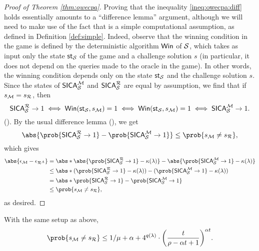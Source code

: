 \begin{proof}[Proof of Theorem \ref{thm:owecpa}]
  Proving that the inequality \eqref{ineq:owecpa:diff} holds
  essentially amounts to a ``difference lemma'' argument,
  although we will need to make use of the fact that \Simple is a simple computational assumption,
  as defined in Definition \ref{def:simple}.
  Indeed, observe that the winning condition in the game \SICA
  is defined by the deterministic algorithm \(\mathsf{Win}\) of \(\mathcal{S}\),
  which takes as input only the state \(\mathsf{st}_{\mathcal{S}}\) of the game and a challenge solution \(s\)
  (in particular, it does not depend on the queries made to the oracle \oracle
  in the game).
  In other words, the winning condition depends only on the state
  \(\mathsf{st}_{\mathcal{S}}\) and the challenge solution \(s\).
  Since the states of \(\mathsf{SICA}_{\mathcal{S}}^{\mathcal{M}}\) and \(\SICA_{\Simple}^{\redR}\)
  are equal by assumption, we find that if \(s_{\redM} = s_{\redR}\), then
  \[
  \SICA_{\Simple}^{\redR} \to 1 \iff \Win(\state_{\Simple},s_{\redM}) = 1 \iff \Win(\state_{\Simple},s_{\redM}) = 1 \iff \SICA_{\Simple}^{\redM} \to 1.
  \]
  ().
  By the usual difference lemma (), we get
  \[
    \abs{\prob{\SICA_{\Simple}^{\redR} \to 1} - \prob{\SICA_{\Simple}^{\redM} \to 1}}
    \le \prob{s_{\redM} \ne s_{\redR}},
  \]
  which gives
  \begin{align}
    \abs{\epsilon_{\redM} - \epsilon_{\redR^{A}}}
    & = \abs*{\abs{\prob{\SICA_{\Simple}^{\redR} \to 1} - \kappa(\lambda)} - \abs{\prob{\SICA_{\Simple}^{\redM} \to 1} - \kappa(\lambda)}} \notag\\
    & \le \abs*{(\prob{\SICA_{\Simple}^{\redR} \to 1} - \kappa(\lambda)) - (\prob{\SICA_{\Simple}^{\redM} \to 1} - \kappa(\lambda))} \notag\\
    & = \abs*{\prob{\SICA_{\Simple}^{\redR} \to 1} - \prob{\SICA_{\Simple}^{\redM} \to 1}} \notag\\
    & \le \prob{s_{\redM} \ne s_{\redR}} \notag,
  \end{align}
  as desired.
\end{proof}

\begin{lemma}\label{lemma:M}
  With the same setup as above,
  \begin{equation}
    \prob{s_{\redM} \ne s_{\redR}}
    \le 1/\mu + \alpha
    + 4^{q(\lambda)} \cdot \left( \frac{t}{\rho - \alpha t + 1} \right)^{\alpha t}.
  \end{equation}
\end{lemma}

